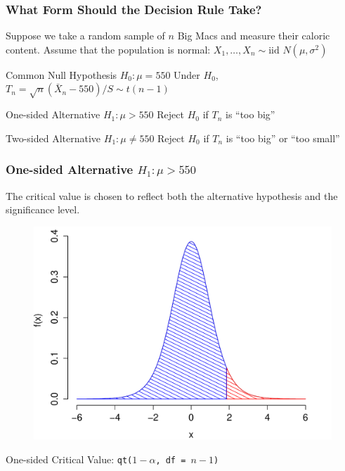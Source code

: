 \documentclass[handout]{beamer}
\begin{document}
\begin{frame}
\frametitle{What Form Should the Decision Rule Take?}
Suppose we take a random sample of $n$ Big Macs and measure their caloric content. Assume that the population is normal: $X_1, \hdots, X_n \sim \mbox{iid } N(\mu, \sigma^2)$ 
\begin{block}{Common Null Hypothesis $H_0\colon \mu = 550$}
Under $H_0$, $T_n = \sqrt{n}(\bar{X}_n - 550)/S \sim t(n-1)$ 
\end{block}
\begin{block}{One-sided Alternative $H_1\colon \mu > 550$}
Reject $H_0$ if $T_n$ is ``too big'' 
\end{block}
\begin{block}{Two-sided Alternative $H_1\colon \mu \neq 550$} 
Reject $H_0$ if $T_n$ is ``too big'' or ``too small''
\end{block}
\end{frame}

\begin{frame}
\frametitle{One-sided Alternative $H_1\colon \mu > 550$}
The critical value is chosen to reflect both the alternative hypothesis and the significance level. 
\begin{figure}
\includegraphics[scale = 0.45]{./images/one_side}
\end{figure}
One-sided Critical Value: \texttt{qt($1-\alpha$, df  = $n-1$)}
\end{frame}


\end{document}
